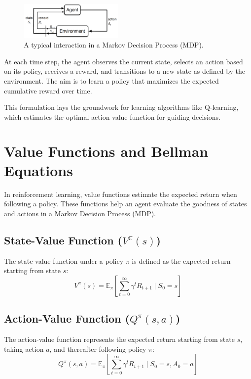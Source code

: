 \documentclass[10pt,twocolumn,letterpaper]{article}
\begin{document}
\begin{figure}[h]
    \centering
    \includegraphics[width=0.45\textwidth]{MDP-model.png}
    \caption{A typical interaction in a Markov Decision Process (MDP).}
    \label{fig:mdp}
\end{figure}

At each time step, the agent observes the current state, selects an action based on its policy, receives a reward, and transitions to a new state as defined by the environment. The aim is to learn a policy that maximizes the expected cumulative reward over time.

This formulation lays the groundwork for learning algorithms like Q-learning, which estimates the optimal action-value function for guiding decisions.


\section{Value Functions and Bellman Equations}

In reinforcement learning, value functions estimate the expected return when following a policy. These functions help an agent evaluate the goodness of states and actions in a Markov Decision Process (MDP).

\subsection*{State-Value Function (\texorpdfstring{$V^\pi(s)$}{Vpi(s)})}

The state-value function under a policy $\pi$ is defined as the expected return starting from state $s$:
\[
V^\pi(s) = \mathbb{E}_\pi \left[ \sum_{t=0}^{\infty} \gamma^t R_{t+1} \mid S_0 = s \right]
\]

\subsection*{Action-Value Function (\texorpdfstring{$Q^\pi(s, a)$}{Qpi(s,a)})}

The action-value function represents the expected return starting from state $s$, taking action $a$, and thereafter following policy $\pi$:
\[
Q^\pi(s, a) = \mathbb{E}_\pi \left[ \sum_{t=0}^{\infty} \gamma^t R_{t+1} \mid S_0 = s, A_0 = a \right]
\]
\end{document}
